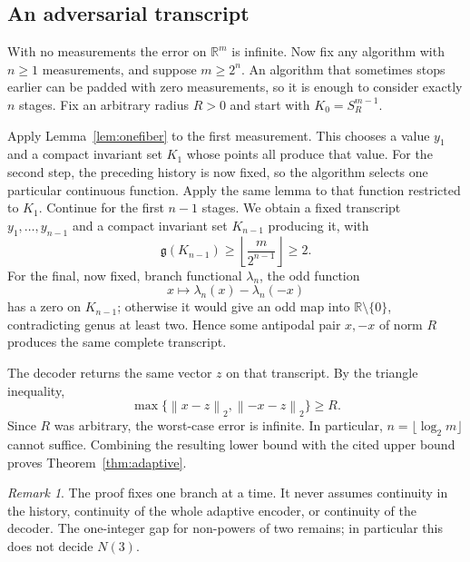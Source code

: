 \documentclass[11pt,a4paper]{article}
\theoremstyle{remark}
\newtheorem{remark}[theorem]{Remark}
\newcommand{\R}{\mathbb R}
\newcommand{\norm}[1]{\left\lVert #1\right\rVert}
\newcommand{\gen}{\mathfrak g}
\begin{document}
\subsection{An adversarial transcript}

With no measurements the error on $\R^m$ is infinite. Now fix any algorithm with $n\ge1$ measurements, and suppose $m\ge2^n$. An algorithm that sometimes stops earlier can be padded with zero measurements, so it is enough to consider exactly $n$ stages. Fix an arbitrary radius $R>0$ and start with $K_0=S_R^{m-1}$.

Apply Lemma~\ref{lem:onefiber} to the first measurement. This chooses a value $y_1$ and a compact invariant set $K_1$ whose points all produce that value. For the second step, the preceding history is now fixed, so the algorithm selects one particular continuous function. Apply the same lemma to that function restricted to $K_1$. Continue for the first $n-1$ stages. We obtain a fixed transcript $y_1,\ldots,y_{n-1}$ and a compact invariant set $K_{n-1}$ producing it, with
\[
 \gen(K_{n-1})\ge
 \left\lfloor\frac{m}{2^{n-1}}\right\rfloor\ge2.
\]
For the final, now fixed, branch functional $\lambda_n$, the odd function
\[
 x\longmapsto\lambda_n(x)-\lambda_n(-x)
\]
has a zero on $K_{n-1}$; otherwise it would give an odd map into $\R\setminus\{0\}$, contradicting genus at least two. Hence some antipodal pair $x,-x$ of norm $R$ produces the same complete transcript.

The decoder returns the same vector $z$ on that transcript. By the triangle inequality,
\[
 \max\{\norm{x-z}_2,\norm{-x-z}_2\}\ge R.
\]
Since $R$ was arbitrary, the worst-case error is infinite. In particular, $n=\lfloor\log_2m\rfloor$ cannot suffice. Combining the resulting lower bound with the cited upper bound proves Theorem~\ref{thm:adaptive}.

\begin{remark}
The proof fixes one branch at a time. It never assumes continuity in the history, continuity of the whole adaptive encoder, or continuity of the decoder. The one-integer gap for non-powers of two remains; in particular this does not decide $N(3)$.
\end{remark}
\end{document}
